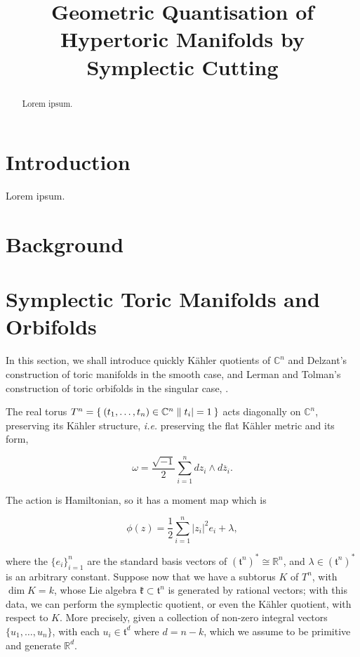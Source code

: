 \documentclass{amsart}
\title{Geometric Quantisation of Hypertoric Manifolds by Symplectic Cutting}
\date{}	%
\newcommand{\ie}{\emph{i.e.} }
\newcommand{\w}{\omega}
\newcommand{\RR}{\mathbb{R}}
\newcommand{\CC}{\mathbb{C}}
\newcommand{\mfk}{\mathfrak{k}}
\newcommand{\mft}{\mathfrak{t}}
\newcommand{\zbar}{\overline{z}}
\begin{document}
	\maketitle
	
	\begin{abstract}
		Lorem ipsum.
	\end{abstract}
	
	\section{Introduction}
	
	Lorem ipsum.
	
	\section{Background}
    
    \section{Symplectic Toric Manifolds and Orbifolds}
	
    In this section, we shall introduce quickly K\"ahler quotients of $\CC^{n}$ and Delzant's construction of toric manifolds in the smooth case, and Lerman and Tolman's construction of toric orbifolds in the singular case, \cite{Del88, Lerman1997}.
    
    The real torus $T^{n} = \Set{(t_{1}, \ldots, t_{n}) \in \CC^{n} | |t_{i}| = 1 }$ acts diagonally on $\CC^{n}$, preserving its K\"ahler structure, \ie preserving the flat K\"ahler metric and its form,

    \begin{equation}\label{eqn:flat-kahler-form}
        \w = \frac{\sqrt{-1}}{2}\sum_{i=1}^{n} dz_{i} \wedge d\zbar_{i}.
    \end{equation}
    
    The action is Hamiltonian, so it has a moment map which is
    
    \begin{equation}\label{eqn:flat-kahler-moment}
        \phi(z) = \frac{1}{2}\sum_{i=1}^{n}|z_{i}|^{2}e_{i} + \lambda,
    \end{equation}
    
    where the $\{e_{i}\}_{i=1}^{n}$ are the standard basis vectors of $(\mft^{n})^{\ast} \cong \RR^{n}$, and $\lambda \in (\mft^{n})^{\ast}$ is an arbitrary constant. Suppose now that we have a subtorus $K$ of $T^{n}$, with $\dim K = k$, whose Lie algebra $\mfk \subset \mft^{n}$ is generated by rational vectors; with this data, we can perform the symplectic quotient, or even the K\"ahler quotient, with respect to $K$. More precisely, given a collection of non-zero integral vectors $\{u_{1}, \ldots, u_{n}\}$, with each $u_{i} \in \mft^{d}$ where $d= n - k$, which we assume to be primitive and generate $\RR^{d}$.
    
\end{document}
